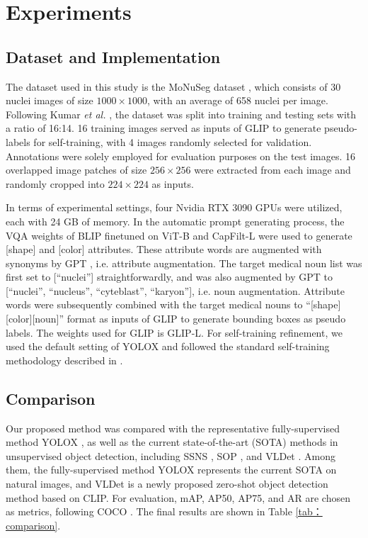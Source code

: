 \documentclass[runningheads]{llncs}
\begin{document}
\section{Experiments}
\subsection{Dataset and Implementation}
The dataset used in this study is the MoNuSeg dataset \cite{kumar2017dataset}, which consists of 30 nuclei images of size $1000\times1000$, with an average of 658 nuclei per image. Following Kumar \textit{et al.} \cite{kumar2017dataset}, the dataset was split into training and testing sets with a ratio of 16:14. 16 training images served as inputs of GLIP to generate pseudo-labels for self-training, with 4 images randomly selected for validation. Annotations were solely employed for evaluation purposes on the test images. 16 overlapped image patches of size $256\times256$ were extracted from each image and randomly cropped into $224\times224$ as inputs.

In terms of experimental settings, four Nvidia RTX 3090 GPUs were utilized, each with 24 GB of memory. In the automatic prompt generating process, the VQA weights of BLIP finetuned on ViT-B and CapFilt-L \cite{li2022blip} were used to generate [shape] and [color] attributes. These attribute words are augmented with synonyms by GPT \cite{radford2019language}, i.e. attribute augmentation. The target medical noun list was first set to [``nuclei''] straightforwardly, and was also augmented by GPT to [``nuclei'', ``nucleus'', ``cyteblast'', ``karyon''], i.e. noun augmentation. Attribute words were subsequently combined with the target medical nouns  to ``[shape][color][noun]'' format as inputs of GLIP to generate bounding boxes as pseudo labels. The weights used for GLIP is GLIP-L. For self-training refinement, we used the default setting of YOLOX and followed the standard self-training methodology described in \cite{dopido2013semisupervised}.
\subsection{Comparison}
Our proposed method was compared with the representative fully-supervised method YOLOX \cite{ge2021yolox}, as well as the current state-of-the-art (SOTA) methods in unsupervised object detection, including SSNS \cite{sahasrabudhe2020self}, SOP \cite{le2022unsupervised}, and VLDet \cite{lin2022learning}. Among them, the fully-supervised method YOLOX represents the current SOTA on natural images, and VLDet is a newly proposed zero-shot object detection method based on CLIP. For evaluation, mAP, AP50, AP75, and AR are chosen as metrics, following COCO \cite{lin2014microsoft}. The final results are shown in Table \ref{tab：comparison}.
\end{document}
